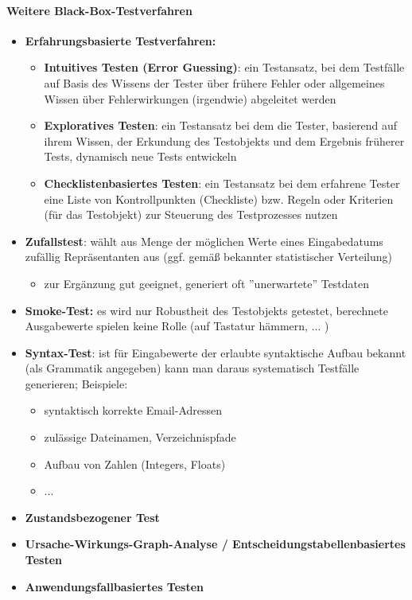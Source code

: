 \paragraph{Weitere Black-Box-Testverfahren}
\begin{itemize}
	\item \textbf{Erfahrungsbasierte Testverfahren:}
	\begin{itemize}
		\item \textbf{Intuitives Testen (Error Guessing)}: ein Testansatz, bei dem Testfälle auf Basis des Wissens der Tester über frühere Fehler oder allgemeines Wissen über Fehlerwirkungen (irgendwie) abgeleitet werden
		\item \textbf{Exploratives Testen}: ein Testansatz bei dem die Tester, basierend auf ihrem Wissen, der Erkundung des Testobjekts und dem Ergebnis früherer Tests, dynamisch neue Tests entwickeln
		\item \textbf{Checklistenbasiertes Testen}: ein Testansatz bei dem erfahrene Tester eine Liste von Kontrollpunkten (Checkliste) bzw. Regeln oder Kriterien (für das Testobjekt) zur Steuerung des Testprozesses nutzen
	\end{itemize}
	\item \textbf{Zufallstest}: wählt aus Menge der möglichen Werte eines Eingabedatums zufällig Repräsentanten aus (ggf. gemäß bekannter statistischer Verteilung)
	\begin{itemize}
		\item zur Ergänzung gut geeignet, generiert oft ''unerwartete'' Testdaten
	\end{itemize}
	\item \textbf{Smoke-Test:} es wird nur Robustheit des Testobjekts getestet, berechnete Ausgabewerte spielen keine Rolle (auf Tastatur hämmern, ... )
	\item \textbf{Syntax-Test}: ist für Eingabewerte der erlaubte syntaktische Aufbau bekannt (als Grammatik angegeben) kann man daraus systematisch Testfälle generieren; Beispiele:
	\begin{itemize}
		\item syntaktisch korrekte Email-Adressen
		\item zulässige Dateinamen, Verzeichnispfade
		\item Aufbau von Zahlen (Integers, Floats)
		\item ...
	\end{itemize}
	\item \textbf{Zustandsbezogener Test}
	\item \textbf{Ursache-Wirkungs-Graph-Analyse / Entscheidungstabellenbasiertes Testen}
	\item \textbf{Anwendungsfallbasiertes Testen}
\end{itemize}


